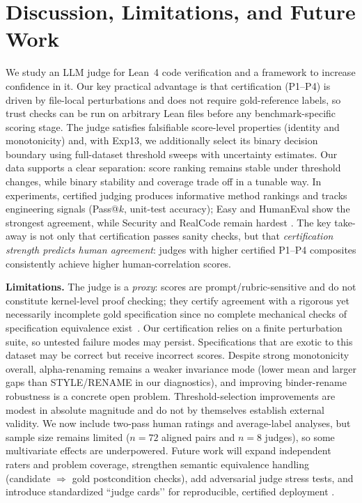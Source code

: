\documentclass[numbers]{article}
\begin{document}
\section{Discussion, Limitations, and Future Work}
We study an LLM judge for Lean~4 code verification and a framework to increase confidence in it.
Our key practical advantage is that certification (P1--P4) is driven by file-local perturbations and does not require gold-reference labels, so trust checks can be run on arbitrary Lean files before any benchmark-specific scoring stage.
The judge satisfies falsifiable score-level properties (identity and monotonicity) and, with Exp13, we additionally select its binary decision boundary using full-dataset threshold sweeps with uncertainty estimates.
Our data supports a clear separation: score ranking remains stable under threshold changes, while binary stability and coverage trade off in a tunable way.
In experiments, certified judging produces informative method rankings and tracks engineering signals (Pass@$k$, unit-test accuracy); Easy and HumanEval show the strongest agreement, while Security and RealCode remain hardest \citep{chen2021evaluating}.
The key take-away is not only that certification passes sanity checks, but that \emph{certification strength predicts human agreement}: judges with higher certified P1--P4 composites consistently achieve higher human-correlation scores.

\textbf{Limitations.} The judge is a \emph{proxy}: scores are prompt/rubric-sensitive and do not constitute kernel-level proof checking; they certify agreement with a rigorous yet necessarily incomplete gold specification since no complete mechanical checks of specification equivalence exist~\citep{rice1953}.
Our certification relies on a finite perturbation suite, so untested failure modes may persist. Specifications that are exotic to this dataset may be correct but receive incorrect scores.
Despite strong monotonicity overall, alpha-renaming remains a weaker invariance mode (lower mean and larger gaps than STYLE/RENAME in our diagnostics), and improving binder-rename robustness is a concrete open problem.
Threshold-selection improvements are modest in absolute magnitude and do not by themselves establish external validity.
We now include two-pass human ratings and average-label analyses, but sample size remains limited (\(n=72\) aligned pairs and \(n=8\) judges), so some multivariate effects are underpowered.
Future work will expand independent raters and problem coverage, strengthen semantic equivalence handling (candidate $\Rightarrow$ gold postcondition checks), add adversarial judge stress tests, and introduce standardized “judge cards’’ for reproducible, certified deployment \citep{zhou2025graders}.
\end{document}
